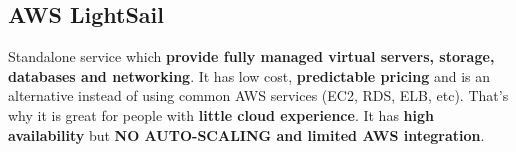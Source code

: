 \subsection{AWS LightSail}\label{subsec:aws-lightsail}
Standalone service which \textbf{provide fully managed virtual servers, storage, databases and networking}\@.
It has low cost, \textbf{predictable pricing} and is an alternative instead of using common AWS services (EC2, RDS, ELB, etc).
That's why it is great for people with \textbf{little cloud experience}.
It has \textbf{high availability} but \textbf{NO AUTO-SCALING and limited AWS integration}.